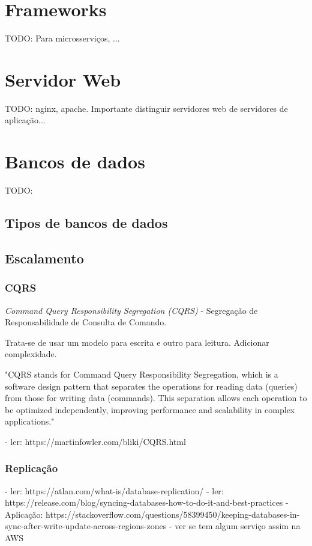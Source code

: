 
\section{Frameworks}
TODO: Para microsserviços, ...

\section{Servidor Web}
TODO: nginx, apache. 
Importante distinguir servidores web de servidores de aplicação...

\section{Bancos de dados}
TODO:

\subsection{Tipos de bancos de dados}


\subsection{Escalamento}

\subsubsection{CQRS}
\emph{Command Query Responsibility Segregation (CQRS)} - Segregação de Responsabilidade de Consulta de Comando. 

Trata-se de usar um modelo para escrita e outro para leitura. Adicionar complexidade. 

"CQRS stands for Command Query Responsibility Segregation, which is a software design pattern that separates the operations for reading data (queries) from those for writing data (commands). This separation allows each operation to be optimized independently, improving performance and scalability in complex applications."


- ler: https://martinfowler.com/bliki/CQRS.html


\subsubsection{Replicação}
- ler: https://atlan.com/what-is/database-replication/
- ler: https://release.com/blog/syncing-databases-how-to-do-it-and-best-practices
- Aplicação: https://stackoverflow.com/questions/58399450/keeping-databases-in-sync-after-write-update-across-regions-zones
- ver se tem algum serviço assim na AWS

